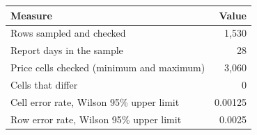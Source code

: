 \begin{tabular}{lr}
\toprule
\textbf{Measure} & \textbf{Value} \\
\midrule
Rows sampled and checked & 1,530 \\
Report days in the sample & 28 \\
Price cells checked (minimum and maximum) & 3,060 \\
Cells that differ & 0 \\
Cell error rate, Wilson 95\% upper limit & 0.00125 \\
Row error rate, Wilson 95\% upper limit & 0.0025 \\
\bottomrule
\end{tabular}

